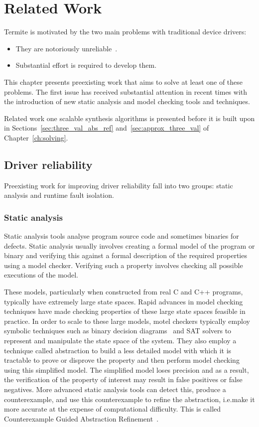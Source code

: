 \chapter{Related Work}
\label{ch:related}

Termite is motivated by the two main problems with traditional device drivers:

\begin{itemize}
    \item They are notoriously unreliable~\cite{Chou_YCHE_01,Ganapathi_GP_06}.
    \item Substantial effort is required to develop them.
\end{itemize}

This chapter presents preexisting work that aims to solve at least one of these problems. The first issue has received substantial attention in recent times with the introduction of new static analysis and model checking tools and techniques. 

Related work one scalable synthesis algorithms is presented before it is built upon in Sections~\ref{sec:three_val_abs_ref} and~\ref{sec:approx_three_val} of Chapter~\ref{ch:solving}.

\section{Driver reliability}
Preexisting work for improving driver reliability fall into two groups: static analysis and runtime fault isolation.

\subsection{Static analysis}
Static analysis tools analyse program source code and sometimes binaries for defects. Static analysis usually involves creating a formal model of the program or binary and verifying this against a formal description of the required properties using a model checker. Verifying such a property involves checking all possible executions of the model.

These models, particularly when constructed from real C and C++ programs, typically have extremely large state spaces. Rapid advances in model checking techniques have made checking properties of these large state spaces feasible in practice. In order to scale to these large models, motel checkers typically employ symbolic techniques such as binary decision diagrams~\cite{Bryant_86} and SAT solvers to represent and manipulate the state space of the system. They also employ a technique called abstraction to build a less detailed model with which it is tractable to prove or disprove the property and then perform model checking using this simplified model. The simplified model loses precision and as a result, the verification of the property of interest may result in false positives or false negatives. More advanced static analysis tools can detect this, produce a counterexample, and use this counterexample to refine the abstraction, i.e.\@ make it more accurate at the expense of computational difficulty. This is called Counterexample Guided Abstraction Refinement~\cite{Clarke_GJLV_00}.

